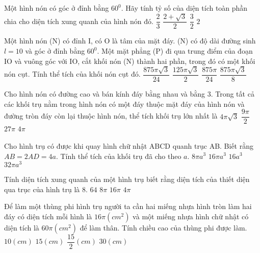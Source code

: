 \begin{ex}%
	Một hình nón có góc ở đỉnh bằng $60^0$. Hãy tính tỷ số của  diện tích toàn phần chia cho diện tích xung quanh của hình nón đó.
	\choice
	{$\dfrac{2}{3}$}
	{$\dfrac{2+\sqrt{3}}{2}$}
	{\True $\dfrac{3}{2}$}
	{$2$}
\end{ex}


\begin{ex}%
	Một hình nón (N) có đỉnh I, có O là tâm của mặt đáy. (N)  có độ dài đường sinh $l=10$ và góc ở đỉnh bằng $60^0$. Một mặt phẳng (P) đi qua trung điểm của đoạn IO và vuông góc với IO, cắt khối nón (N) thành hai phần, trong đó có một khối nón cụt. Tính thể tích của khối nón cụt đó.
	\choice
	{\True $\dfrac{875\pi \sqrt{3}}{24}$}
	{$\dfrac{125\pi\sqrt{3}}{2}$}
	{$\dfrac{875\pi}{24}$}
	{$\dfrac{875\pi\sqrt{3}}{8}$}
\end{ex}

\begin{ex}%
	Cho hình nón có đường cao và bán kính đáy bằng nhau và bằng $3$. Trong tất cả các khối trụ nằm trong hình nón có một đáy thuộc mặt đáy của hình nón và đường tròn đáy còn lại thuộc hình nón, thể tích khối trụ lớn nhất là
	\choice
	{$4\pi\sqrt{3}$}
	{$\dfrac{9\pi}{2}$}
	{$27\pi$}
	{\True $4\pi$}
\end{ex}

\begin{ex}%
	Cho hình trụ có được khi quay hình chữ nhật ABCD quanh trục AB. Biết rằng $AB=2AD=4a$. Tính thể tích của khối trụ đã cho theo $a$.
	\choice
	{$8\pi a^3$}
	{\True $16\pi a^3$}
	{$16a^3$}
	{$32\pi a^3$}
\end{ex}


\begin{ex}%
	Tính diện tích xung quanh của một hình trụ biết rằng diện tích của thiết diện qua trục của hình trụ là $8$.
	\choice
	{$64$}
	{\True $8\pi$}
	{$16\pi$}
	{$4\pi$}
\end{ex}
\begin{ex}%
	Để làm một thùng phi hình trụ người ta cần hai miếng nhựa hình tròn làm hai đáy có diện tích mỗi hình là $16\pi (cm^2)$ và một miếng nhựa hình chữ nhật có diện tích là $60 \pi (cm^2)$ để làm thân. Tính chiều cao của thùng phi được làm. 
	\choice
	{$10 (cm)$}
	{$15 (cm)$}
	{\True $\dfrac{15}{2} (cm)$}
	{$30 (cm)$}
\end{ex}

